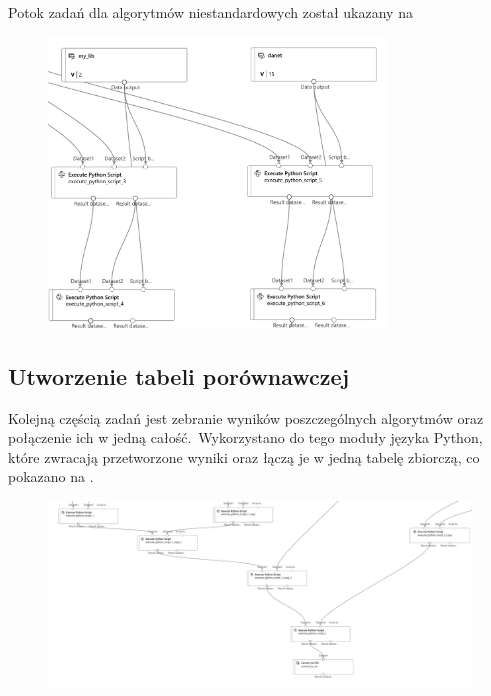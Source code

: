 Potok zadań dla algorytmów niestandardowych został ukazany na 

\begin{figure}[H]
    \centering
    \includegraphics[width=0.8\textwidth]{images/au-pipe}
    \label{fig:au-pipe}
\end{figure}

\subsection{Utworzenie tabeli porównawczej}
Kolejną częścią zadań jest zebranie wyników poszczególnych algorytmów oraz połączenie ich w jedną całość.\ Wykorzystano do tego moduły języka Python, które zwracają przetworzone wyniki oraz łączą je w jedną tabelę zbiorczą, co pokazano na .

\begin{figure}[H]
    \centering
    \includegraphics[width=\textwidth]{images/pipe-csv}
    \label{fig:pipe-4}
\end{figure}

